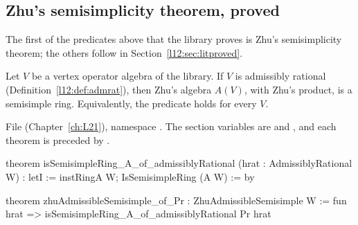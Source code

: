 \subsection{Zhu's semisimplicity theorem, proved}

The first of the predicates above that the library proves is Zhu's semisimplicity theorem; the others follow in
Section~\ref{l12:sec:litproved}.

\begin{theorem}\label{l12:thm:zhuss}
Let $V$ be a vertex operator algebra of the library. If $V$ is admissibly rational (Definition~\ref{l12:def:admrat}), then
Zhu's algebra $A(V)$, with Zhu's product, is a semisimple ring. Equivalently, the predicate 
holds for every $V$.
\end{theorem}
\noindent File  (Chapter~\ref{ch:L21}), namespace
. The section variables are  and
\allowbreak{}, and each theorem is preceded by
.
\begin{leancode}
theorem isSemisimpleRing_A_of_admissiblyRational (hrat : AdmissiblyRational W) :
    letI := instRingA W; IsSemisimpleRing (A W) := by

theorem zhuAdmissibleSemisimple_of_Pr : ZhuAdmissibleSemisimple W :=
  fun hrat => isSemisimpleRing_A_of_admissiblyRational Pr hrat
\end{leancode}


